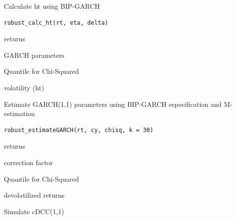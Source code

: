 \documentclass[letterpaper]{book}
\begin{document}
%
\begin{Description}
Calculate ht using BIP-GARCH
\end{Description}
%
\begin{Usage}
\begin{verbatim}
robust_calc_ht(rt, eta, delta)
\end{verbatim}
\end{Usage}
%
\begin{Arguments}
\begin{ldescription}
\item[\code{rt}] returns

\item[\code{eta}] GARCH parameters

\item[\code{delta}] Quantile for Chi-Squared
\end{ldescription}
\end{Arguments}
%
\begin{Value}
volatility (ht)
\end{Value}
%
\begin{Description}
Estimate GARCH(1,1) parameters using BIP-GARCH especification and 
M-estimation
\end{Description}
%
\begin{Usage}
\begin{verbatim}
robust_estimateGARCH(rt, cy, chisq, k = 30)
\end{verbatim}
\end{Usage}
%
\begin{Arguments}
\begin{ldescription}
\item[\code{rt}] returns

\item[\code{cy}] correction factor

\item[\code{chisq}] Quantile for Chi-Squared
\end{ldescription}
\end{Arguments}
%
\begin{Value}
devolatilized returns
\end{Value}
%
\begin{Description}
Simulate cDCC(1,1)
\end{Description}
\end{document}
